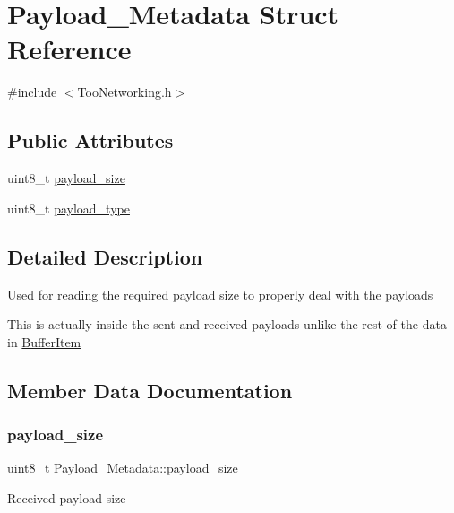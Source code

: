 \hypertarget{structPayload__Metadata}{}\section{Payload\+\_\+\+Metadata Struct Reference}
\label{structPayload__Metadata}


{\ttfamily \#include $<$Too\+Networking.\+h$>$}

\subsection*{Public Attributes}
\begin{DoxyCompactItemize}
\item 
uint8\+\_\+t \hyperlink{structPayload__Metadata_a5d517fb1e486f468bef3f42b93b6707d}{payload\+\_\+size}
\item 
uint8\+\_\+t \hyperlink{structPayload__Metadata_a5009210cc0592eda44bd9fd05b17d2a8}{payload\+\_\+type}
\end{DoxyCompactItemize}


\subsection{Detailed Description}
Used for reading the required payload size to properly deal with the payloads

This is actually inside the sent and received payloads unlike the rest of the data in \hyperlink{structBufferItem}{Buffer\+Item} 

\subsection{Member Data Documentation}
\mbox{\label{structPayload__Metadata_a5d517fb1e486f468bef3f42b93b6707d}} 
\subsubsection{\texorpdfstring{payload\+\_\+size}{payload\_size}}
{\footnotesize\ttfamily uint8\+\_\+t Payload\+\_\+\+Metadata\+::payload\+\_\+size}

Received payload size \mbox{\label{structPayload__Metadata_a5009210cc0592eda44bd9fd05b17d2a8}} 
